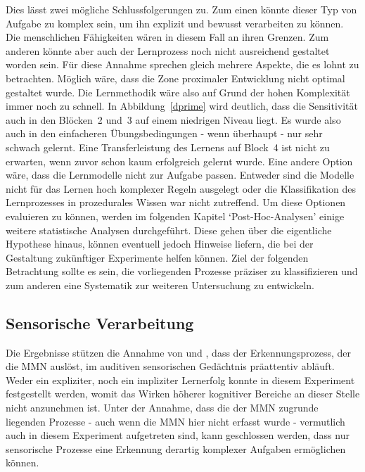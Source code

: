 \documentclass[doc,a4paper,12pt]{apa6}
\begin{document}
Dies lässt zwei mögliche Schlussfolgerungen zu. Zum einen könnte dieser Typ von Aufgabe zu komplex sein, um ihn explizit und bewusst verarbeiten zu können. Die menschlichen Fähigkeiten wären in diesem Fall an ihren Grenzen. Zum anderen könnte aber auch der Lernprozess noch nicht ausreichend gestaltet worden sein. Für diese Annahme sprechen gleich mehrere Aspekte, die es lohnt zu betrachten. Möglich wäre, dass die Zone proximaler Entwicklung \parencite{kozulin2003vygotsky} nicht optimal gestaltet wurde. Die Lernmethodik wäre also auf Grund der hohen Komplexität immer noch zu schnell. In Abbildung~\ref{dprime} wird deutlich, dass die Sensitivität auch in den Blöcken~2 und~3 auf einem niedrigen Niveau liegt. Es wurde also auch in den einfacheren Übungsbedingungen - wenn überhaupt - nur sehr schwach gelernt. Eine Transferleistung des Lernens auf Block~4 ist nicht zu erwarten, wenn zuvor schon kaum erfolgreich gelernt wurde. Eine andere Option wäre, dass die Lernmodelle nicht zur Aufgabe passen. Entweder sind die Modelle nicht für das Lernen hoch komplexer Regeln ausgelegt oder die Klassifikation des Lernprozesses in prozedurales Wissen war nicht zutreffend. Um diese Optionen evaluieren zu können, werden im folgenden Kapitel `Post-Hoc-Analysen' einige weitere statistische Analysen durchgeführt. Diese gehen über die eigentliche Hypothese hinaus, können eventuell jedoch Hinweise liefern, die bei der Gestaltung zukünftiger Experimente helfen können. Ziel der folgenden Betrachtung sollte es sein, die vorliegenden Prozesse präziser zu klassifizieren und zum anderen eine Systematik zur weiteren Untersuchung zu entwickeln.

\subsection{Sensorische Verarbeitung}

Die Ergebnisse stützen die Annahme von \textcite{paavilainen2007preattentive} und \textcite{bendixen2008rapid}, dass der Erkennungsprozess, der die MMN auslöst, im auditiven sensorischen Gedächtnis präattentiv abläuft. Weder ein expliziter, noch ein impliziter Lernerfolg konnte in diesem Experiment festgestellt werden, womit das Wirken höherer kognitiver Bereiche an dieser Stelle nicht anzunehmen ist. Unter der Annahme, dass die der MMN zugrunde liegenden Prozesse - auch wenn die MMN hier nicht erfasst wurde - vermutlich auch in diesem Experiment aufgetreten sind, kann geschlossen werden, dass nur sensorische Prozesse eine Erkennung derartig komplexer Aufgaben ermöglichen können.
\end{document}

